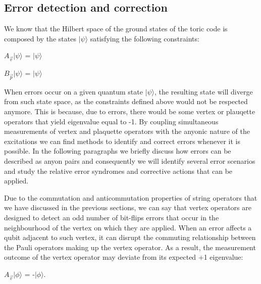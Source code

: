 \documentclass{Configuration_Files/PoliMi3i_thesis}
\begin{document}
\subsection{Error detection and correction}

We know that the Hilbert space of the ground states of the toric code is composed by the states $|\psi\rangle $ satisfying the following constraints: 

\begin{center}
	$A_{\vec{v}}|\psi\rangle $ = $|\psi\rangle $ 
\end{center}
\begin{center}
	$B_{\vec{p}}|\psi\rangle $ = $|\psi\rangle $ 
\end{center}

When errors occur on a given quantum state $|\psi\rangle$, the resulting state will diverge from such state space, as the constraints defined above would not be respected anymore. This is because, due to errors, there would be some vertex or plauqette operators that yield eigenvalue equal to -1. \newline
By coupling simultaneous measurements of vertex and plaquette operators with the anyonic nature of the excitations we can find methods to identify and correct errors whenever it is possible. In the following paragraphs we briefly discuss how errors can be described as anyon pairs and consequently we will identify several error scenarios and study the relative error syndromes and corrective actions that can be applied. \newline

Due to the commutation and anticommutation properties of string operators that we have discussed in the previous sections, we can say that vertex operators are designed to detect an odd number of bit-flips errors that occur in the neighbourhood of the vertex on which they are applied. When an error affects a qubit adjacent to such vertex, it can disrupt the commuting relationship between the Pauli operators making up the vertex operator. As a result, the measurement outcome of the vertex operator may deviate from its expected +1 eigenvalue: 

\begin{center}
	$A_{\vec{v}}|\phi\rangle $ = -$|\phi\rangle $.
\end{center}
\end{document}
